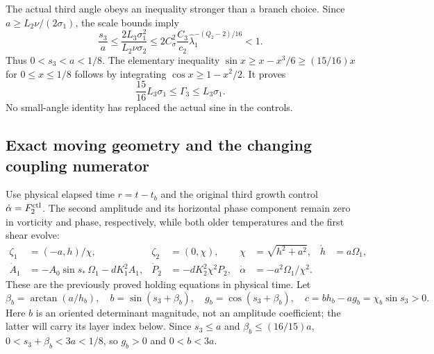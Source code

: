 The actual third angle obeys an inequality stronger than a branch
choice. Since $a\geq L_2\nu/(2\sigma_1)$, the scale bounds imply
\[
 \frac{s_3}{a}
 \leq\frac{2L_3\sigma_1^2}{L_2\nu\sigma_2}
 \leq2C_\sigma^2\frac{C_3}{c_2}
             \widehat\lambda_1^{-(Q_2-2)/16}<1.
\]
Thus $0<s_3<a<1/8$. The elementary inequality
$\sin x\geq x-x^3/6\geq(15/16)x$ for $0\leq x\leq1/8$
follows by integrating $\cos x\geq1-x^2/2$.
It proves
\begin{equation}\label{cvlane:tge:rate_scale}
 \frac{15}{16}L_3\sigma_1\leq\Gamma_3\leq L_3\sigma_1.
\end{equation}
No small-angle identity has replaced the actual sine in the controls.

\subsection{Exact moving geometry and the changing coupling numerator}

Use physical elapsed time $r=t-t_b$ and the original third growth
control $\dot\alpha=F_2^{\rm ctl}$. The second amplitude and its
horizontal phase component remain zero in vorticity and phase,
respectively, while both older temperatures and the first shear evolve:
\begin{align}
 \zeta_1&=(-a,h)/\chi,&\zeta_2&=(0,\chi),&
 \chi&=\sqrt{h^2+a^2},&\dot h&=a\Omega_1,\nonumber\\
 \dot A_1&=-A_0\sin s_*\,\Omega_1-dK_1^2A_1,&
 \dot P_2&=-dK_2^2\chi^2P_2,&
 \dot\alpha&=-a^2\Omega_1/\chi^2.
 \label{cvlane:tge:older_hold}
\end{align}
These are the previously proved holding equations in physical time.
Let
\begin{equation}\label{cvlane:tge:detconstants}
 \beta_b=\arctan(a/h_b),\quad
 b=\sin(s_3+\beta_b),\quad g_b=\cos(s_3+\beta_b),\quad
 c=bh_b-ag_b=\chi_b\sin s_3>0.
\end{equation}
Here $b$ is an oriented determinant magnitude, not an amplitude
coefficient; the latter will carry its layer index below.
Since $s_3\leq a$ and $\beta_b\leq(16/15)a$,
$0<s_3+\beta_b<3a<1/8$, so $g_b>0$ and $0<b<3a$.

